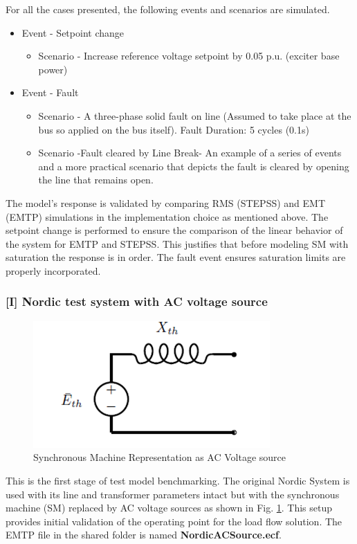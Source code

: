 \documentclass{report}
\begin{document}
For all the cases presented, the following events and scenarios are simulated. 
\begin{itemize}
    \item[1.] Event - Setpoint change 
    \begin{itemize}
        \item[1.] Scenario - Increase reference voltage setpoint by 0.05 p.u. (exciter base power)
    \end{itemize}
    \item[2.] Event - Fault
    \begin{itemize}
        \item[2.] Scenario - A three-phase solid fault on line (Assumed to take place at the bus so applied on the bus itself). Fault Duration: 5 cycles (0.1s) 
        \item[3.] Scenario -Fault cleared by Line Break- An example of a series of events and a more practical scenario that depicts the fault is cleared by opening the line that remains open.
    \end{itemize}
\end{itemize}
The model's response is validated by comparing RMS (STEPSS) and EMT (EMTP) simulations in the implementation choice as mentioned above. The setpoint change is performed to ensure the comparison of the linear behavior of the system for EMTP and STEPSS. This justifies that before modeling SM with saturation the response is in order. The fault event ensures saturation limits are properly incorporated. 

\subsubsection{[I] Nordic test system with AC voltage source}
\begin{figure}
    \centering
    \includegraphics[width=0.5\linewidth]{Figure_Nordic/SMasACvoltageSource.png}
    \caption{Synchronous Machine Representation as AC Voltage source}
    \label{fig:AC}
\end{figure}
This is the first stage of test model benchmarking. The original Nordic System is used with its line and transformer parameters intact but with the synchronous machine (SM) replaced by AC voltage sources as shown in Fig. \ref{fig:AC}. This setup provides initial validation of the operating point for the load flow solution. The EMTP file in the shared folder is named \textbf{NordicACSource.ecf}.
\end{document}

